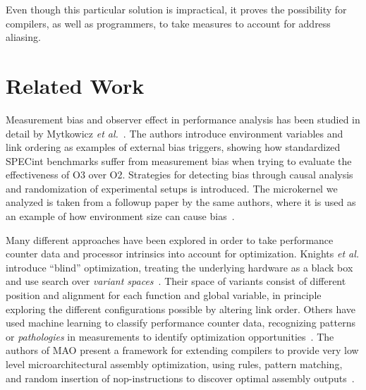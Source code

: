\documentclass[10pt, conference, compsocconf]{IEEEtran}
\begin{document}
Even though this particular solution is impractical, it proves the possibility for compilers, as well as programmers, to take measures to account for address aliasing.


\section{Related Work}
\label{sec:related}
Measurement bias and observer effect in performance analysis has been studied in detail by Mytkowicz \emph{et al.}~\cite{Mytkowicz:2008:OE&MB,Mytkowicz:2008:Easy}.
The authors introduce environment variables and link ordering as examples of external bias triggers, showing how standardized {\small SPECint} benchmarks suffer from measurement bias when trying to evaluate the effectiveness of O3 over O2. 
Strategies for detecting bias through causal analysis and randomization of experimental setups is introduced.
The microkernel we analyzed is taken from a followup paper by the same authors, where it is used as an example of how environment size can cause bias~\cite{Mytkowicz:2009:WrongData}.

Many different approaches have been explored in order to take performance counter data and processor intrinsics into account for optimization.
Knights \emph{et al.} introduce ``blind'' optimization, treating the underlying hardware as a black box and use search over \emph{variant spaces}~\cite{Knights:2009:BlindOpt}.
Their space of variants consist of different position and alignment for each function and global variable, in principle exploring the different configurations possible by altering link order.
Others have used machine learning to classify performance counter data, recognizing patterns or \emph{pathologies} in measurements to identify optimization opportunities~\cite{Yoo:ADD}.
The authors of MAO present a framework for extending compilers to provide very low level microarchitectural assembly optimization, using rules, pattern matching, and random insertion of nop-instructions to discover optimal assembly outputs~\cite{Hundt:2011:MAO}.
\end{document}
